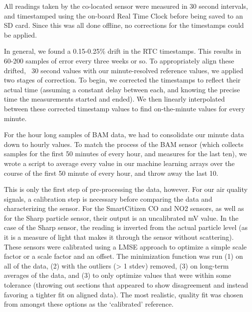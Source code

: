 All readings taken by the co-located sensor were measured in 30 second intervals, and timestamped using the on-board Real Time Clock before being saved to an SD card.  Since this was all done offline, no corrections for the timestamps could be applied.

In general, we found a 0.15-0.25\% drift in the RTC timestamps.  This results in 60-200 samples of error every three weeks or so.  To appropriately align these drifted, ~30 second values with our minute-resolved reference values, we applied two stages of correction.  To begin, we corrected the timestamps to reflect their actual time (assuming a constant delay between each, and knowing the precise time the measurements started and ended).  We then linearly interpolated between these corrected timestamp values to find on-the-minute values for every minute.

For the hour long samples of BAM data, we had to consolidate our minute data down to hourly values.  To match the process of the BAM sensor (which collects samples for the first 50 minutes of every hour, and measures for the last ten), we wrote a script to average every value in our machine learning arrays over the course of the first 50 minute of every hour, and throw away the last 10.

This is only the first step of pre-processing the data, however.  For our air quality signals, a calibration step is necessary before comparing the data and characterizing the sensor.  For the SmartCitizen CO and NO2 sensors, as well as for the Sharp particle sensor, their output is an uncalibrated mV value.  In the case of the Sharp sensor, the reading is inverted from the actual particle level (as it is a measure of light that makes it through the sensor without scattering).  These sensors were calibrated using a LMSE approach to optimize a simple scale factor or a scale factor and an offset.  The minimization function was run (1) on all of the data, (2) with the outliers (> 1 stdev) removed, (3) on long-term averages of the data, and (3) to only optimize values that were within some tolerance (throwing out sections that appeared to show disagreement and instead favoring a tighter fit on aligned data).  The most realistic, quality fit was chosen from amongst these options as the `calibrated' reference.

